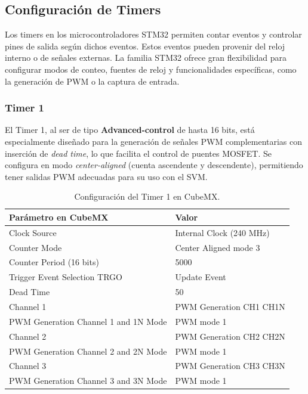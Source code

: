 \documentclass[11pt]{report}
\begin{document}
\subsection{Configuración de Timers}
Los timers en los microcontroladores STM32 permiten contar eventos y controlar pines de salida según dichos eventos. Estos eventos pueden provenir del reloj interno o de señales externas. La familia STM32 ofrece gran flexibilidad para configurar modos de conteo, fuentes de reloj y funcionalidades específicas, como la generación de PWM o la captura de entrada.

\subsubsection{Timer 1}
El Timer 1, al ser de tipo \textbf{Advanced-control} de hasta 16 bits, está especialmente diseñado para la generación de señales PWM complementarias con inserción de \emph{dead time}, lo que facilita el control de puentes MOSFET. Se configura en modo \emph{center-aligned} (cuenta ascendente y descendente), permitiendo tener salidas PWM adecuadas para su uso con el SVM.

\begin{table}[h!]
	\centering
	\begin{tabular}{| l | l |}
		\hline
		\textbf{Parámetro en CubeMX}         & \textbf{Valor}           \\
		\hline
		Clock Source                         & Internal Clock (240 MHz) \\
		Counter Mode                         & Center Aligned mode 3    \\
		Counter Period (16 bits)             & 5000                     \\
		Trigger Event Selection TRGO         & Update Event             \\
		Dead Time                            & 50                       \\
		\hline
		Channel 1                            & PWM Generation CH1 CH1N  \\
		PWM Generation Channel 1 and 1N Mode & PWM mode 1               \\
		\hline
		Channel 2                            & PWM Generation CH2 CH2N  \\
		PWM Generation Channel 2 and 2N Mode & PWM mode 1               \\
		\hline
		Channel 3                            & PWM Generation CH3 CH3N  \\
		PWM Generation Channel 3 and 3N Mode & PWM mode 1               \\
		\hline
	\end{tabular}
	\caption{Configuración del Timer 1 en CubeMX.}
	\label{TIM1_config}
\end{table}
\FloatBarrier
\end{document}
